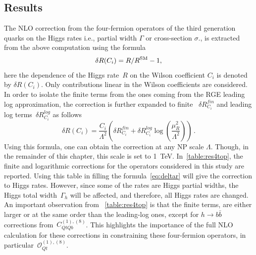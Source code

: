 	\subsection{Results}
	The NLO correction from the four-fermion operators of the third generation quarks on the Higgs rates i.e.,  partial width $\Gamma$ or cross-section $\sigma$., is extracted from the above computation using the formula
	\begin{equation}
		\delta R(C_i) = R/R^{\mathrm{SM}} -1,
		\label{eq:deltaR}
	\end{equation}
	here the dependence of  the Higgs rate~$R$ on the Wilson coefficient $C_i$ is denoted by $\delta R(C_i) $.  Only contributions linear in the Wilson coefficients are considered. In order to isolate the finite terms from the ones coming from the RGE leading log approximation, the correction is further expanded to finite ~$\delta R_{C_i}^{fin}$ and leading log terms~$\delta R_{C_i}^{log}$ as follows
	\begin{equation}
		\delta R(C_i)= \frac{C_i}{\Lambda^2}\left(\delta R_{C_i}^{fin}+ \delta R_{C_i}^{log} \log\left(\frac{\mu_R^2}{\Lambda^2}\right)\right)\,.
		\label{eq:deltar}
	\end{equation}
	Using this formula, one can obtain the correction at any NP scale $\Lambda$. Though, in the remainder of this chapter, this scale is set to \SI{1}{TeV}. In~\autoref{table:res4top}, the finite and logarithmic corrections for the operators considered in this study are reported. Using this table in filling the formula~\eqref{eq:deltar} will give the correction to Higgs rates.  However, since some of the rates are Higgs partial widths, the Higgs total width~$\Gamma_h$ will be affected, and therefore, all Higgs rates are changed.
	An important observation from ~\autoref{table:res4top} is that the finite terms, are either larger or at the same order than the leading-log ones, except for $h\to b\bar{b}$ corrections from~$C_{QtQb}^{(1),(8)}$. This highlights the importance of the full NLO calculation for these corrections in constraining these four-fermion operators, in particular~$\mathcal O_{Qt}^{(1),(8)}$. 
	
